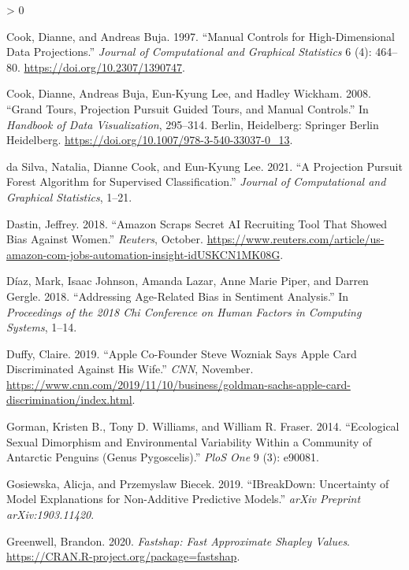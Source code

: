 \documentclass[
]{article}
\newlength{\cslhangindent}
\newenvironment{CSLReferences}[2] %
 {%
  \setlength{\parindent}{0pt}
  \ifodd #1 \everypar{\setlength{\hangindent}{\cslhangindent}}\ignorespaces\fi
  \ifnum #2 > 0
  \setlength{\parskip}{#2\baselineskip}
  \fi
 }%
 {}
\begin{document}
\begin{CSLReferences}{1}{0}
\leavevmode\hypertarget{ref-cook_manual_1997}{}%
Cook, Dianne, and Andreas Buja. 1997. {``Manual {Controls} for {High}-{Dimensional} {Data} {Projections}.''} \emph{Journal of Computational and Graphical Statistics} 6 (4): 464--80. \url{https://doi.org/10.2307/1390747}.

\leavevmode\hypertarget{ref-cook_grand_2008}{}%
Cook, Dianne, Andreas Buja, Eun-Kyung Lee, and Hadley Wickham. 2008. {``Grand {Tours}, {Projection} {Pursuit} {Guided} {Tours}, and {Manual} {Controls}.''} In \emph{Handbook of {Data} {Visualization}}, 295--314. Berlin, Heidelberg: Springer Berlin Heidelberg. \url{https://doi.org/10.1007/978-3-540-33037-0_13}.

\leavevmode\hypertarget{ref-da_silva_projection_2021}{}%
da Silva, Natalia, Dianne Cook, and Eun-Kyung Lee. 2021. {``A {Projection} {Pursuit} {Forest} {Algorithm} for {Supervised} {Classification}.''} \emph{Journal of Computational and Graphical Statistics}, 1--21.

\leavevmode\hypertarget{ref-dastin_amazon_2018}{}%
Dastin, Jeffrey. 2018. {``Amazon Scraps Secret {AI} Recruiting Tool That Showed Bias Against Women.''} \emph{Reuters}, October. \url{https://www.reuters.com/article/us-amazon-com-jobs-automation-insight-idUSKCN1MK08G}.

\leavevmode\hypertarget{ref-diaz_addressing_2018}{}%
Díaz, Mark, Isaac Johnson, Amanda Lazar, Anne Marie Piper, and Darren Gergle. 2018. {``Addressing Age-Related Bias in Sentiment Analysis.''} In \emph{Proceedings of the 2018 Chi Conference on Human Factors in Computing Systems}, 1--14.

\leavevmode\hypertarget{ref-duffy_apple_2019}{}%
Duffy, Claire. 2019. {``Apple Co-Founder {Steve} {Wozniak} Says {Apple} {Card} Discriminated Against His Wife.''} \emph{CNN}, November. \url{https://www.cnn.com/2019/11/10/business/goldman-sachs-apple-card-discrimination/index.html}.

\leavevmode\hypertarget{ref-gorman_ecological_2014}{}%
Gorman, Kristen B., Tony D. Williams, and William R. Fraser. 2014. {``Ecological Sexual Dimorphism and Environmental Variability Within a Community of {Antarctic} Penguins (Genus {Pygoscelis}).''} \emph{PloS One} 9 (3): e90081.

\leavevmode\hypertarget{ref-gosiewska_ibreakdown_2019}{}%
Gosiewska, Alicja, and Przemyslaw Biecek. 2019. {``{IBreakDown}: {Uncertainty} of Model Explanations for Non-Additive Predictive Models.''} \emph{arXiv Preprint arXiv:1903.11420}.

\leavevmode\hypertarget{ref-greenwell_fastshap_2020}{}%
Greenwell, Brandon. 2020. \emph{Fastshap: {Fast} {Approximate} {Shapley} {Values}}. \url{https://CRAN.R-project.org/package=fastshap}.


\end{CSLReferences}
\end{document}
